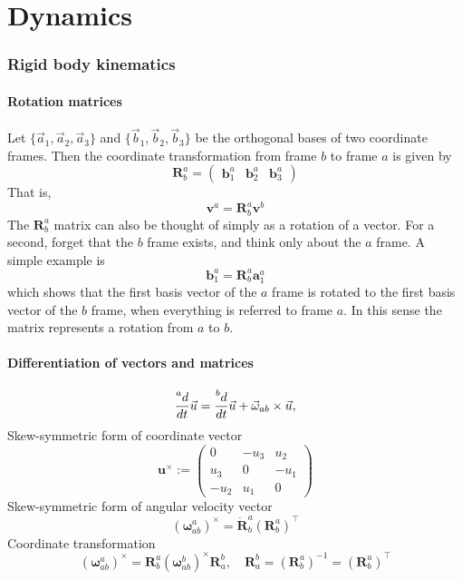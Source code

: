 \part{Dynamics}
\section{Rigid body kinematics}
\subsection{Rotation matrices}
Let $\{\vec{a}_1, \vec{a}_2, \vec{a}_3\}$ and $\{\vec{b}_1, \vec{b}_2, \vec{b}_3\}$ be the orthogonal bases of two coordinate frames. Then the coordinate transformation from frame $b$ to frame $a$ is given by
\begin{equation}
    \mathbf{R}^a_b = 
    \begin{pmatrix}
    \mathbf{b}^a_1 & \mathbf{b}^a_2 & \mathbf{b}^a_3 
    \end{pmatrix}
\end{equation}
That is,
\begin{equation}
    \mathbf{v}^a = \mathbf{R}^a_b \mathbf{v}^b
\end{equation}
The $\mathbf{R}^a_b$ matrix can also be thought of simply as a rotation of a vector. For a second, forget that the $b$ frame exists, and think only about the $a$ frame. A simple example is 
\begin{equation}
    \mathbf{b}^a_1 = \mathbf{R}^a_b \mathbf{a}^a_1
\end{equation}
which shows that the first basis vector of the $a$ frame is rotated to the first basis vector of the $b$ frame, when everything is referred to frame $a$. In this sense the matrix represents a rotation from $a$ to $b$.
\subsection{Differentiation of vectors and matrices}
\begin{equation}
    \frac{\prescript{a}{}d}{dt} \vec{u} = \frac{\prescript{b}{}d}{dt} \vec{u} + \vec{\omega}_{ab} \times \vec{u},
\end{equation}
Skew-symmetric form of coordinate vector
\begin{equation}
    \mathbf{u}^\times := 
    \begin{pmatrix}
    0 & -u_3 & u_2\\
    u_3 & 0 & -u_1\\
    -u_2 & u_1 & 0
    \end{pmatrix}
\end{equation}
Skew-symmetric form of angular velocity vector
\begin{equation}
    (\boldsymbol{\omega}^a_{ab})^\times = \dot{\mathbf{R}}^a_b (\mathbf{R}^a_b)^\top
\end{equation}
Coordinate transformation
\begin{equation}
    (\boldsymbol{\omega}^a_{ab})^\times = \mathbf{R}^a_b (\boldsymbol{\omega}^b_{ab})^\times \mathbf{R}^b_a, \quad
    \mathbf{R}^b_a = (\mathbf{R}^a_b)^{-1} = (\mathbf{R}^a_b)^\top
\end{equation}

